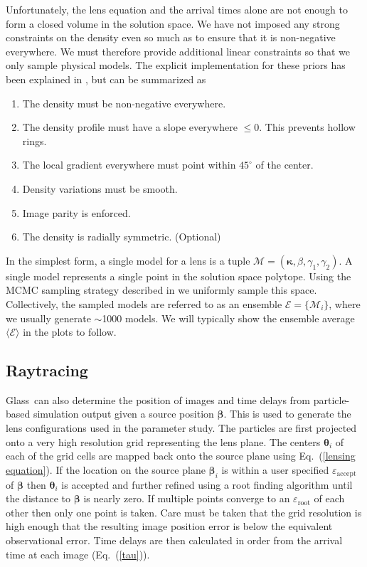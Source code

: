 \documentclass[onecolumn,galley]{mn2e}
\newcommand{\Glass}{{\sc Glass}}
\newcommand{\M}{\ensuremath{\mathscr{M}}}
\newcommand{\E}{\ensuremath{\mathscr{E}}}
\newcommand{\eps}{\ensuremath{\varepsilon}}
\newcommand{\Eavg}{\ensuremath{\langle \E \rangle}}
\newcommand{\eqnref}[1] {Eq.~(\ref{#1})}
\renewcommand{\vec}[1]{\ensuremath{\boldsymbol{#1}}}
\begin{document}
Unfortunately, the lens equation and the arrival times alone are not enough to form a
closed volume in the solution space. We have not imposed any strong constraints
on the density even so much as to ensure that it is non-negative everywhere. We
must therefore provide additional linear constraints so that we only sample
physical models. The explicit implementation for these priors has been
explained in \cite{}, but can be summarized as
\begin{enumerate}
\item The density must be non-negative everywhere.
\item The density profile must have a slope everywhere $\le 0$. This prevents hollow rings.
\item The local gradient everywhere must point within $45^{\circ}$ of the center.
\item Density variations must be smooth.
\item Image parity is enforced.
\item The density is radially symmetric. (Optional)
\end{enumerate}

In the simplest form, a single model for a lens is a tuple $\M = (\vec\kappa,
\beta, \gamma_1, \gamma_2)$. A single model represents a single point in the
solution space polytope. Using the MCMC sampling strategy described in \cite{}
we uniformly sample this space. Collectively, the sampled models are referred
to as an ensemble $\E = \{\M_i\}$, where we usually generate $\sim$1000 models. We
will typically show the ensemble average $\Eavg$ in the plots to
follow.



\subsection{Raytracing}
\label{Raytracing}
\Glass\ can also determine the position of images and time delays from 
particle-based simulation output given a source position $\vec\beta$. This is
used to generate the lens configurations used in the parameter study.  The
particles are first projected onto a very high resolution grid representing the
lens plane. The centers $\vec\theta_i$ of each of the grid cells are mapped
back onto the source plane using \eqnref{lensing equation}. If the location on
the source plane $\vec\beta_i$ is within a user specified
$\eps_\mathrm{accept}$ of $\vec\beta$ then $\vec\theta_i$ is 
accepted and further refined using a root finding algorithm until the distance
to $\vec\beta$ is nearly zero. If multiple points converge to an
$\eps_\mathrm{root}$ of each other then only one point is taken.  Care must be
taken that the grid resolution is high enough that the resulting image position
error is below the equivalent observational error. Time delays are then
calculated in order from the arrival time at each image (\eqnref{tau}).
\end{document}

